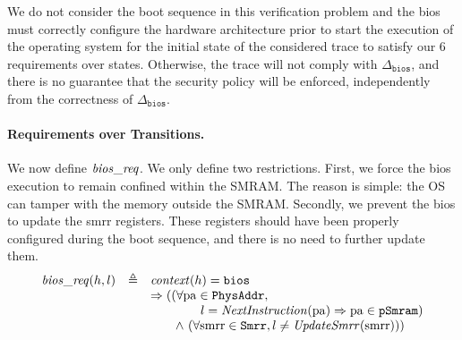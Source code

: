 We do not consider the boot sequence in this verification problem and the
\ac{bios} must correctly configure the hardware architecture prior to start the
execution of the operating system for the initial state of the considered trace
to satisfy our 6 requirements over states.
%
Otherwise, the trace will not comply with \( \Delta_{\mathtt{bios}} \), and
there is no guarantee that the security policy will be enforced, independently
from the correctness of \( \Delta_{\mathtt{bios}} \).


\paragraph{Requirements over Transitions.}
%
We now define $\mathit{bios\_req}$.
%
We only define two restrictions.
%
First, we force the \ac{bios} execution to remain confined within the SMRAM.
%
The reason is simple: the OS can tamper with the memory outside the SMRAM.
%
Secondly, we prevent the \ac{bios} to update the \ac{smrr} registers.
%
These registers should have been properly configured during the boot sequence, and
there is no need to further update them.
%
\[
  \begin{array}{rcl}
    \func{bios\_req}(h, l)
    & \triangleq
    & \func{context}(h) = \val{bios} \\
    & %
    & \Rightarrow ((\forall \var{pa} \in \texttt{PhysAddr}, \\
    & %
    & \qquad\qquad l = \func{NextInstruction}(\var{pa})
      \Rightarrow \var{pa} \in \texttt{pSmram}) \\
    & %
    & \qquad\wedge~(\forall \var{smrr} \in \texttt{Smrr}, l \neq \func{UpdateSmrr}(\var{smrr})))
  \end{array}
\]

